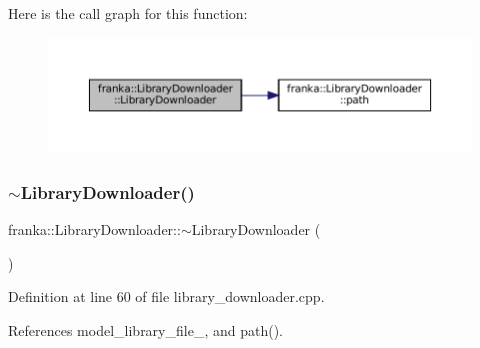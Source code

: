 Here is the call graph for this function\+:
\nopagebreak
\begin{figure}[H]
\begin{center}
\leavevmode
\includegraphics[width=350pt]{classfranka_1_1LibraryDownloader_acf92ea08d6799c36eb57df91ab876544_cgraph}
\end{center}
\end{figure}
\mbox{\label{classfranka_1_1LibraryDownloader_a036c9b6d446b873446a41c6ce3feffbe}} 
\subsubsection{\texorpdfstring{$\sim$\+Library\+Downloader()}{~LibraryDownloader()}}
{\footnotesize\ttfamily franka\+::\+Library\+Downloader\+::$\sim$\+Library\+Downloader (\begin{DoxyParamCaption}{ }\end{DoxyParamCaption})}



Definition at line 60 of file library\+\_\+downloader.\+cpp.



References model\+\_\+library\+\_\+file\+\_\+, and path().


